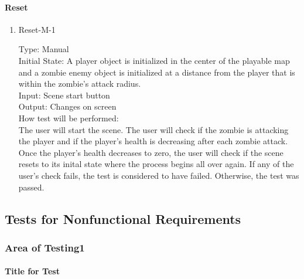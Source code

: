 \documentclass[12pt, titlepage]{article}
\begin{document}
\paragraph{Reset}

\begin{enumerate}

\item{Reset-M-1\\}

Type: Manual \\
					
Initial State: A player object is initialized in the center of the playable map and a zombie enemy object is initialized at a distance from the player that is within the zombie's attack radius.\\
					
Input: Scene start button \\
					
Output: Changes on screen \\
					
How test will be performed:\\  The user will start the scene. The user will check if the zombie is attacking the player and if the player's health is decreasing after each zombie attack. Once the player's health decreases to zero, the user will check if the scene resets to its inital state where the process begins all over again. If any of the user's check fails, the test is considered to have failed. Otherwise, the test was passed. \\

\end{enumerate}

\subsection{Tests for Nonfunctional Requirements}

\subsubsection{Area of Testing1}
		
\paragraph{Title for Test}
\end{document}
